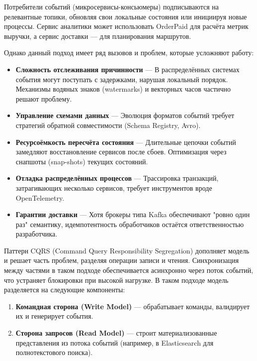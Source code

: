             
            Потребители событий (микросервисы-консьюмеры) подписываются на релевантные топики, обновляя свои локальные состояния или инициируя новые процессы. Сервис аналитики может использовать OrderPaid для расчёта метрик выручки, а сервис доставки — для планирования маршрутов.
            
            
            Однако данный подход имеет ряд вызовов и проблем, которые усложняют работу:
            \begin{itemize}
                \item \textbf{Сложность отслеживания причинности} — В распределённых системах события могут поступать с задержками, нарушая локальный порядок. Механизмы водяных знаков (watermarks) и векторных часов частично решают проблему.
                \item \textbf{Управление схемами данных} — Эволюция форматов событий требует стратегий обратной совместимости (Schema Registry, Avro).
                \item \textbf{Ресурсоёмкость пересчёта состояния} — Длительные цепочки событий замедляют восстановление сервисов после сбоев. Оптимизация через снапшоты (snap-shots) текущих состояний.
                \item \textbf{Отладка распределённых процессов} — Трассировка транзакций, затрагивающих несколько сервисов, требует инструментов вроде OpenTelemetry.
                \item \textbf{Гарантии доставки} — Хотя брокеры типа Kafka обеспечивают "ровно один раз" семантику, идемпотентность обработчиков остаётся ответственностью разработчика.
            \end{itemize}

            
            Паттерн CQRS (Command Query Responsibility Segregation) дополняет модель и решает часть проблем, разделяя операции записи и чтения. Синхронизация между частями в таком подходе обеспечивается асинхронно через поток событий, что устраняет блокировки при высокой нагрузке. В таком подходе модель разделяется на следующие компоненты:
            \begin{enumerate}
                \item \textbf{Командная сторона (Write Model)} — обрабатывает команды, валидирует их и генерирует события.
                \item \textbf{Сторона запросов (Read Model)} — строит материализованные представления из потока событий (например, в Elasticsearch для полнотекстового поиска).
            \end{enumerate}

